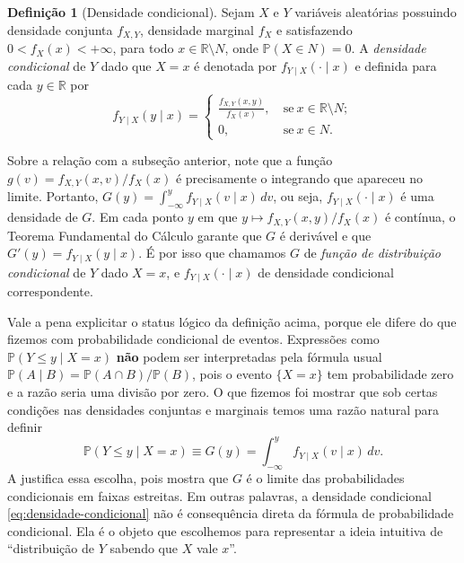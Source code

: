 \documentclass[12pt,portuguese]{article}
\theoremstyle{definition}
\newtheorem{definition}[definition]{Definição}
\theoremstyle{plainexercise}
\theoremstyle{starredexercise}
\theoremstyle{definition}
\begin{document}
\begin{definition}[Densidade condicional]\label{def:densidade-condicional}
  Sejam $X$ e $Y$ variáveis aleatórias possuindo 
  densidade conjunta $f_{X,Y}$,
  densidade marginal $f_X$ e satisfazendo $0<f_X(x)<+\infty$, 
  para todo $x\in\mathbb{R}\setminus N$, onde $\mathbb{P}(X\in N)=0$. 
  A \emph{densidade condicional} de $Y$ dado que
  $X = x$ é denotada por $f_{Y\mid X}(\cdot \mid x)$ e definida para cada $y\in\mathbb{R}$ por
  \begin{equation}
    f_{Y\mid X}(y \mid x) 
    = 
    \begin{cases}
    \displaystyle\frac{f_{X,Y}(x,y)}{f_X(x)},& \ \text{se}\ x\in \mathbb{R}\setminus N;
    \\[0.4cm]
    0,&\ \text{se}\ x\in N.
    \end{cases} 
    \label{eq:densidade-condicional}
  \end{equation}
\end{definition}


Sobre a relação com a subseção anterior, note que a função
$g(v) = f_{X,Y}(x,v)/f_X(x)$ é precisamente o integrando que apareceu no limite. Portanto,
$G(y) = \int_{-\infty}^{y} f_{Y\mid X}(v \mid x)\,dv$, ou seja, $f_{Y\mid X}(\cdot \mid x)$
é uma densidade de $G$. Em cada ponto $y$ em que $y \mapsto f_{X,Y}(x,y)/f_X(x)$ é
contínua, o Teorema Fundamental do Cálculo garante que $G$ é derivável e que
$G'(y) = f_{Y\mid X}(y \mid x)$. É por isso que chamamos $G$ de \emph{função de
distribuição condicional} de $Y$ dado $X = x$, e $f_{Y\mid X}(\cdot \mid x)$ de densidade
condicional correspondente.

Vale a pena explicitar o status lógico da definição acima, porque ele difere do que
fizemos com probabilidade condicional de eventos. Expressões como
$\mathbb{P}(Y \leqslant y \mid X = x)$ \textbf{não} podem ser interpretadas pela fórmula
usual $\mathbb{P}(A \mid B) = \mathbb{P}(A \cap B)/\mathbb{P}(B)$, pois o evento
$\{X = x\}$ tem probabilidade zero e a razão seria uma divisão por zero. 
O que fizemos foi mostrar que sob certas condições nas densidades conjuntas e marginais 
temos uma razão natural para definir 
\[
  \mathbb{P}(Y \leqslant y \mid X = x) \equiv G(y)
  = \int_{-\infty}^{y} f_{Y\mid X}(v \mid x)\,dv.
\]
A  justifica essa escolha, pois mostra que $G$ é o limite das
probabilidades condicionais em faixas estreitas. Em outras palavras, a densidade
condicional \eqref{eq:densidade-condicional} não é consequência direta da fórmula de
probabilidade condicional. Ela é o objeto que escolhemos para representar a ideia
intuitiva de ``distribuição de $Y$ sabendo que $X$ vale $x$''.
\end{document}
